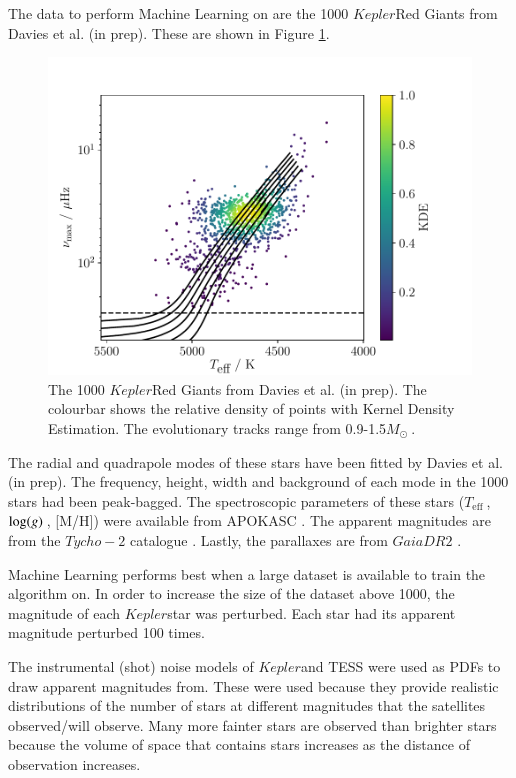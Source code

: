 \documentclass[a4paper,fleqn,usenatbib,useAMS]{mnras}
\newcommand{\teff}{\ensuremath{T_{\textrm{eff}}\:}}
\newcommand{\kep}{\ensuremath{Kepler}\:}
\newcommand{\msol}{\ensuremath{M_{\odot}\:}}
\newcommand{\logg}{\ensuremath{{\rm log}(g)\:}}
\begin{document}
The data to perform Machine Learning on are the 1000 \kep Red Giants from Davies et al. (in prep). These are shown in Figure \ref{fig:dataset}.
\begin{figure}
	\centering
	\includegraphics[scale=0.5]{Plot1_HR.pdf}
	\caption{The 1000 \kep Red Giants from Davies et al. (in prep). The colourbar shows the relative density of points with Kernel Density Estimation. The evolutionary tracks range from 0.9-1.5\msol.}	
	\label{fig:dataset}
\end{figure}
The radial and quadrapole modes of these stars have been fitted by Davies et al. (in prep). The frequency, height, width and background of each mode in the 1000 stars had been peak-bagged. The spectroscopic parameters of these stars (\teff, \logg, [M/H]) were available from APOKASC \citet{pinsonneault_apokasc_2014}. The apparent magnitudes are from the $Tycho-2$ catalogue \citet{hog_tycho-2_2000}. Lastly, the parallaxes are from $Gaia DR2$ \citet{lindegren_gaia_2018}.

Machine Learning performs best when a large dataset is available to train the algorithm on. In order to increase the size of the dataset above 1000, the magnitude of each \kep star was perturbed. Each star had its apparent magnitude perturbed 100 times. 

The instrumental (shot) noise models of \kep and TESS were used as PDFs to draw apparent magnitudes from. These were used because they provide realistic distributions of the number of stars at different magnitudes that the satellites observed/will observe. Many more fainter stars are observed than brighter stars because the volume of space that contains stars increases as the distance of observation increases.
\end{document}

